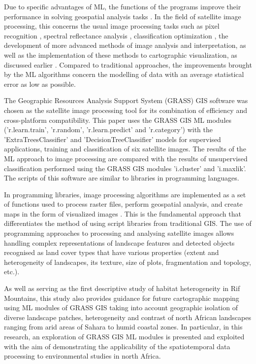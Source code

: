 \documentclass[geomatics,article,submit,pdftex,moreauthors]{Definitions/mdpi}
\begin{document}
Due to specific advantages of ML, the functions of the programs improve their performance in solving geospatial analysis tasks \cite{More02072020,Lemenkova202403,GarciaPedrero03042017}. In the field of satellite image processing, this concerns the usual image processing tasks such as pixel recognition \cite{NASIRI2023103555,EBRAHIMY2023103390}, spectral reflectance analysis \cite{FU2024104421}, classification optimization \cite{PADHY2024100278,Lemenkova202401}, the development of more advanced methods of image analysis and interpretation, as well as the implementation of these methods to cartographic visualization, as discussed earlier \cite{HABIB20231,Lemenkova202406,KHALDI2024104191}. Compared to traditional approaches, the improvements brought by the ML algorithms concern the modelling of data with an average statistical error as low as possible.

The Geographic Resources Analysis Support System (GRASS) GIS software was chosen as the satellite image processing tool for its combination of efficiency and cross-platform compatibility. This paper uses the GRASS GIS ML modules ('r.learn.train', 'r.random', 'r.learn.predict' and 'r.category') with the 'ExtraTreesClassifier' and 'DecisionTreeClassifier' models for supervised applications, training and classification of six satellite images. The results of the ML approach to image processing are compared with the results of unsupervised classification performed using the GRASS GIS modules 'i.cluster' and 'i.maxlik'. The scripts of this software are similar to libraries in programming languages.

In programming libraries, image processing algorithms are implemented as a set of functions used to process raster files, perform geospatial analysis, and create maps in the form of visualized images \cite{Lemenkova202227,PEREIRA2023106653,ESKANDARI2024}. This is the fundamental approach that differentiates the method of using script libraries from traditional GIS. The use of programming approaches to processing and analysing satellite images allows handling complex representations of landscape features and detected objects recognised as land cover types that have various properties (extent and heterogeneity of landscapes, its texture, size of plots, fragmentation and topology, etc.).

As well as serving as the first descriptive study of habitat heterogeneity in Rif Mountains, this study also provides guidance for future cartographic mapping using ML modules of GRASS GIS taking into account geographic isolation of diverse landscape patches, heterogeneity and contrast of north African landscapes ranging from arid areas of Sahara to humid coastal zones. In particular, in this research, an exploration of GRASS GIS ML modules is presented and exploited with the aim of demonstrating the applicability of the spatiotemporal data processing to environmental studies in north Africa.
\end{document}
